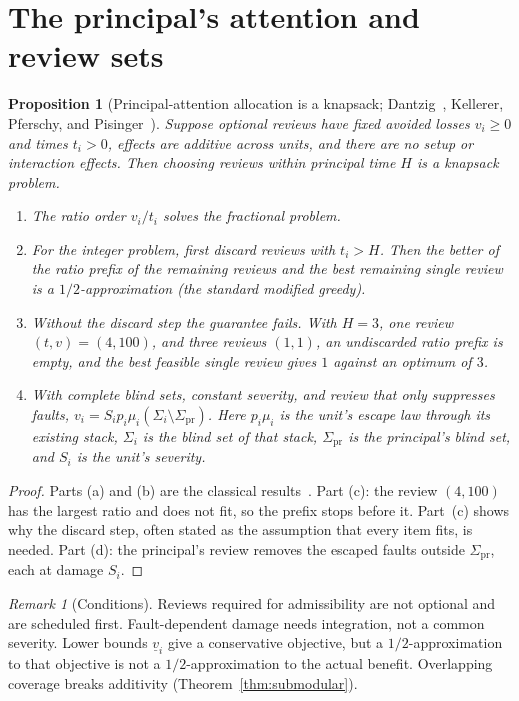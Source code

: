 \documentclass[11pt]{article}
\newtheorem{proposition}[theorem]{Proposition}
\theoremstyle{definition}
\theoremstyle{remark}
\newtheorem{remark}[theorem]{Remark}
\newcommand{\pr}{\mathrm{pr}}
\begin{document}
\section{The principal's attention and review sets}\label{sec:principal}
\begin{proposition}[Principal-attention allocation is a knapsack; Dantzig~\cite{dantzig},
Kellerer, Pferschy, and Pisinger~\cite{kellerer}]\label{prop:knapsack}
Suppose optional reviews have fixed avoided losses $v_i\ge0$ and times $t_i>0$, effects are additive
across units, and there are no setup or interaction effects. Then choosing reviews within principal
time $H$ is a knapsack problem.
\begin{enumerate}[label=(\alph*),itemsep=2pt]
\item The ratio order $v_i/t_i$ solves the fractional problem.
\item For the integer problem, first discard reviews with $t_i>H$. Then the better of the ratio prefix
of the remaining reviews and the best remaining single review is a $1/2$-approximation (the standard
modified greedy).
\item Without the discard step the guarantee fails. With $H=3$, one review $(t,v)=(4,100)$, and three
reviews $(1,1)$, an undiscarded ratio prefix is empty, and the best feasible single review gives $1$
against an optimum of $3$.
\item With complete blind sets, constant severity, and review that only suppresses faults,
$v_i=S_ip_i\mu_i(\Sigma_i\setminus\Sigma_{\pr})$. Here $p_i\mu_i$ is the unit's escape law through its
existing stack, $\Sigma_i$ is the blind set of that stack, $\Sigma_{\pr}$ is the principal's blind set,
and $S_i$ is the unit's severity.
\end{enumerate}
\end{proposition}
\begin{proof}
Parts (a) and (b) are the classical results~\cite{dantzig,kellerer}. Part (c): the review $(4,100)$
has the largest ratio and does not fit, so the prefix stops before it. Part~(c) shows why the
discard step, often stated as the assumption that every item fits, is needed. Part (d): the principal's review
removes the escaped faults outside $\Sigma_{\pr}$, each at damage $S_i$.
\end{proof}
\begin{remark}[Conditions]
Reviews required for admissibility are not optional and are scheduled first. Fault-dependent damage
needs integration, not a common severity. Lower bounds $\underline v_i$ give a conservative objective,
but a $1/2$-approximation to that objective is not a $1/2$-approximation to the actual benefit.
Overlapping coverage breaks additivity (Theorem~\ref{thm:submodular}).
\end{remark}
\end{document}
